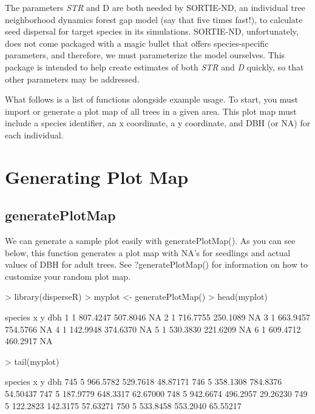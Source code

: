 \documentclass{article}
\begin{document}
The parameters \textit{STR} and {D} are both needed by SORTIE-ND, an individual tree neighborhood dynamics forest gap model (say that five times fast!), to calculate seed dispersal for target species in its simulations. SORTIE-ND, unfortunately, does not come packaged with a magic bullet that offers species-specific parameters, and therefore, we must parameterize the model ourselves. This package is intended to help create estimates of both \textit{STR} and \textit{D} quickly, so that other parameters may be addressed.

What follows is a list of functions alongside example usage. To start, you must import or generate a plot map of all trees in a given area. This plot map must include a species identifier, an x coordinate, a y coordinate, and DBH (or NA) for each individual.

\section{Generating Plot Map}

\subsection{generatePlotMap}
We can generate a sample plot easily with generatePlotMap(). As you can see below, this function generates a plot map with NA's for seedlings and actual values of DBH for adult trees. See ?generatePlotMap() for information on how to customize your random plot map.
\begin{Schunk}
\begin{Sinput}
> library(disperseR)
> myplot <- generatePlotMap()
> head(myplot)
\end{Sinput}
\begin{Soutput}
  species        x        y dbh
1       1 807.4247 507.8046  NA
2       1 716.7755 250.1089  NA
3       1 663.9457 754.5766  NA
4       1 142.9948 374.6370  NA
5       1 530.3830 221.6209  NA
6       1 609.4712 460.2917  NA
\end{Soutput}
\begin{Sinput}
> tail(myplot)
\end{Sinput}
\begin{Soutput}
    species        x        y      dbh
745       5 966.5782 529.7618 48.87171
746       5 358.1308 784.8376 54.50437
747       5 187.9779 648.3317 62.67000
748       5 942.6674 496.2957 29.26230
749       5 122.2823 142.3175 57.63271
750       5 533.8458 553.2040 65.55217
\end{Soutput}
\end{Schunk}
\end{document}
